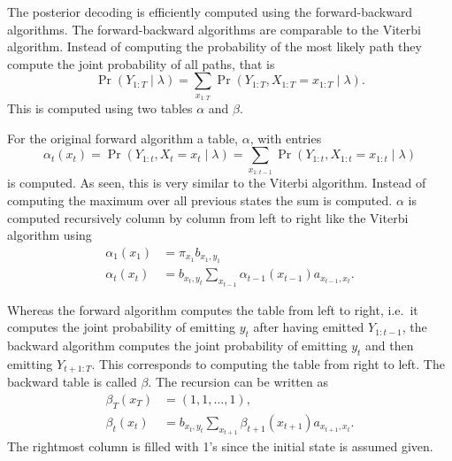The posterior decoding is efficiently computed using the forward-backward
algorithms. The forward-backward algorithms are comparable to the Viterbi
algorithm. Instead of computing the probability of the most likely path they
compute the joint probability of all paths, that is
\begin{equation*}
  \Pr
  \left(
    Y_{1:T} \mid \lambda
  \right) = \sum_{x_{1:T}} \Pr
  \left(
    Y_{1:T}, X_{1:T} = x_{1:T} \mid \lambda
  \right).
\end{equation*}
This is computed using two tables $\alpha$ and $\beta$.

For the original forward algorithm a table, $\alpha$, with entries
\begin{equation*}
\alpha_t(x_t) = \Pr \left( Y_{1:t}, X_t = x_t \mid \lambda \right) =
\sum_{x_{1:t-1}} \Pr \left( Y_{1:t}, X_{1:t} = x_{1:t} \mid \lambda \right)
\end{equation*}
is computed. As seen, this is very similar to the Viterbi algorithm. Instead of
computing the maximum over all previous states the sum is computed. $\alpha$ is
computed recursively column by column from left to right like the Viterbi
algorithm using
\begin{equation}
  \label{eq:8}
  \begin{aligned}
    \alpha_1(x_1) &= \pi_{x_1} b_{x_1, y_1} \\
    \alpha_t(x_t) &= b_{x_t, y_t} \sum_{x_{t - 1}} \alpha_{t - 1}(x_{t - 1})
    a_{x_{t - 1}, x_t}.
  \end{aligned}
\end{equation}

Whereas the forward algorithm computes the table from left to right, i.e.\
it computes the joint probability of emitting $y_t$ after having emitted
$Y_{1:t-1}$, the backward algorithm computes the joint probability of emitting
$y_t$ and then emitting $Y_{t+1:T}$. This corresponds to computing the table from
right to left. The backward table is called $\beta$. The recursion can be written as
\begin{equation}
  \label{eq:9}
  \begin{aligned}
    \beta_T(x_T) &= (1, 1, \dots, 1), \\
    \beta_t(x_t) &= b_{x_t, y_t} \sum_{x_{t + 1}} \beta_{t + 1}(x_{t + 1})
    a_{x_{t + 1}, x_t}.
  \end{aligned}
\end{equation}
The rightmost column is filled with 1's since the initial state is assumed
given.

